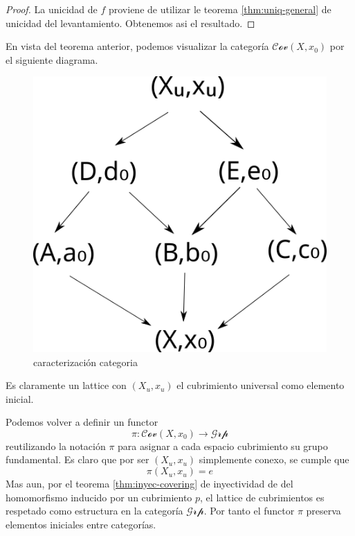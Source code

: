 \begin{proof}
  La unicidad de \(f\) proviene de utilizar le teorema
  \ref{thm:uniq-general} de unicidad del levantamiento. Obtenemos asi el
  resultado.
\end{proof}

En vista del teorema anterior, podemos visualizar la categoría
\(\mathscr{Cov} (X, x_0)\) por el siguiente diagrama.
\begin{figure}[h]
  \centering
  \includegraphics[scale=0.3]{./imagenes/cov.png}
  \caption{caracterización categoria}
\end{figure}
Es claramente un lattice con \((X_u, x_u)\) el cubrimiento universal
como elemento inicial.

Podemos volver a definir un functor
\[ \pi : \mathscr{Cov} (X, x_0) \to \mathscr{Grp} \]
reutilizando la notación \(\pi\) para asignar a cada espacio cubrimiento
su grupo fundamental. Es claro que por ser \((X_u, x_u)\) simplemente
conexo, se cumple que
\[ \pi (X_u, x_u) = {e} \]
Mas aun, por el teorema \ref{thm:inyec-covering} de inyectividad de del
homomorfismo inducido por un cubrimiento \(p\), el lattice de
cubrimientos es respetado como estructura en la categoría
\(\mathscr{Grp}\). Por tanto el functor \(\pi\) preserva elementos
iniciales entre categorías.